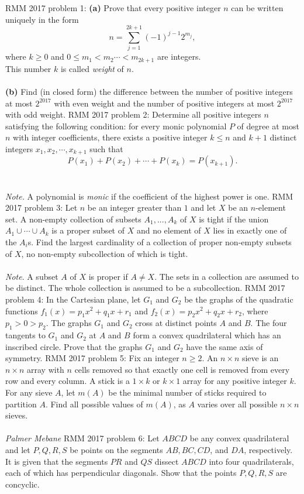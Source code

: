 RMM 2017 problem 1:  \textbf{(a)} Prove that every positive integer $n$ can be written uniquely in the form
\[ n=\sum_{j=1}^{2k+1}(-1)^{j-1}2^{m_j}, \]
where $k\geq 0$ and $0\le m_1<m_2\cdots <m_{2k+1}$ are integers. \\
This number $k$ is called \textit{weight} of $n$. \\\\
\textbf{(b)} Find (in closed form) the difference between the number of positive integers at most $2^{2017}$ with even weight and the number of positive integers at most $2^{2017}$ with odd weight. 
RMM 2017 problem 2:  Determine all positive integers $n$ satisfying the following condition: for every monic polynomial $P$ of degree at most $n$ with integer coefficients, there exists a positive integer $k\le n$ and $k+1$ distinct integers $x_1,x_2,\cdots ,x_{k+1}$ such that
\[ P(x_1)+P(x_2)+\cdots +P(x_k)=P(x_{k+1}) .\] \\\\
\textit{Note.} A polynomial is \textit{monic} if the coefficient of the highest power is one. 
RMM 2017 problem 3:  Let $n$ be an integer greater than $1$ and let $X$ be an $n$-element set. A non-empty collection of subsets $A_1, ..., A_k$ of $X$ is tight if the union $A_1 \cup \cdots  \cup A_k$ is a proper subset of $X$ and no element of $X$ lies in exactly one of the $A_i$s. Find the largest cardinality of a collection of proper non-empty subsets of $X$, no non-empty subcollection of which is tight. \\\\
\textit{Note}. A subset $A$ of $X$ is proper if $A\neq X$. The sets in a collection are assumed to be distinct. The whole collection is assumed to be a subcollection. 
RMM 2017 problem 4:  In the Cartesian plane, let $G_1$ and $G_2$ be the graphs of the quadratic functions $f_1(x) = p_1x^2 + q_1x + r_1$ and $f_2(x) = p_2x^2 + q_2x + r_2$, where $p_1 > 0 > p_2$. The graphs $G_1$ and $G_2$ cross at distinct points $A$ and $B$. The four tangents to $G_1$ and $G_2$ at $A$ and $B$ form a convex quadrilateral which has an inscribed circle. Prove that the graphs $G_1$ and $G_2$ have the same axis of symmetry. 
RMM 2017 problem 5:  Fix an integer $n \geq 2$. An $n\times n$ sieve is an $n\times n$ array with $n$ cells removed so that exactly one cell is removed from every row and every column. A stick is a $1\times k$ or $k\times 1$ array for any positive integer $k$. For any sieve $A$, let $m(A)$ be the minimal number of sticks required to partition $A$. Find all possible values of $m(A)$, as $A$ varies over all possible $n\times n$ sieves. \\\\
\textit{Palmer Mebane} 
RMM 2017 problem 6:  Let $ABCD$ be any convex quadrilateral and let $P, Q, R, S$ be points on the segments $AB, BC, CD$, and $DA$, respectively. It is given that the segments $PR$ and $QS$ dissect $ABCD$ into four quadrilaterals, each of which has perpendicular diagonals. Show that the points $P, Q, R, S$ are concyclic. 


